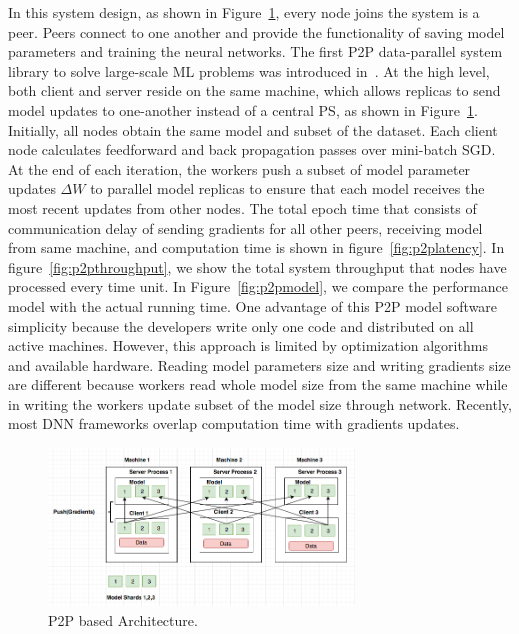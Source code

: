 \documentclass[conference]{IEEEtran}
\begin{document}
In this system design, as shown in Figure~\ref{fig:p2p}, every node joins the system is a peer. Peers connect to one another and provide the functionality of saving model parameters and training the neural networks. The first P2P data-parallel system library to solve large-scale ML problems was introduced in~\cite{li2015malt}. At the high level, both client and server reside on the same machine, which allows replicas to send model updates to one-another instead of a central PS, as shown in Figure~\ref{fig:p2p}. Initially, all nodes obtain the same model and subset of the dataset. Each client node calculates feedforward and back propagation passes over mini-batch SGD. At the end of each iteration, the workers push a subset of model parameter updates $\Delta W$ to parallel model replicas to ensure that each model receives the most recent updates from other nodes. The total epoch time that consists of communication delay of sending gradients for all other peers, receiving model from same machine, and computation time is shown in figure~\ref{fig:p2platency}. In figure~\ref{fig:p2pthroughput}, we show the total system throughput that nodes have processed every time unit. In Figure~\ref{fig:p2pmodel}, we compare the performance model with the actual running time. One advantage of this P2P model software simplicity because the developers write only one code and distributed on all active machines. However, this approach is limited by optimization algorithms and available hardware.
Reading model parameters size and writing gradients size are different because workers read whole model size from the same machine while in writing the workers update subset of the model size through network. Recently, most DNN frameworks overlap computation time with gradients updates.

\begin{figure}[htb]
  \includegraphics[width=3.2in]{Fig/p2p}
  \caption{P2P based Architecture.}
  \label{fig:p2p}
\end{figure}
\end{document}
